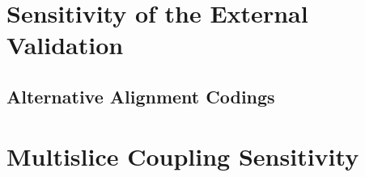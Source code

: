 \documentclass[11pt, letterpaper]{article}
\numberwithin{equation}{section}
\begin{document}
\begin{table}[ht]
\centering\scriptsize
\caption{Recovery of each coded order in the trade network, by method: precision / recall of the community assigned to the order (one-to-one assignment within each year), averaged over the order's active years.}
\label{tab:app_order_recovery_trade}

\end{table}



\section{Sensitivity of the External Validation}
\label{app:validity_robust}

\subsection{Alternative Alignment Codings}
\begin{table}[ht]\centering
\caption{Recovery against independently identified sets of strongly
aligned states.}
\label{tab:app_alt_alignment}
\end{table}

\section{Multislice Coupling Sensitivity}
\label{app:resolution}
\end{document}
